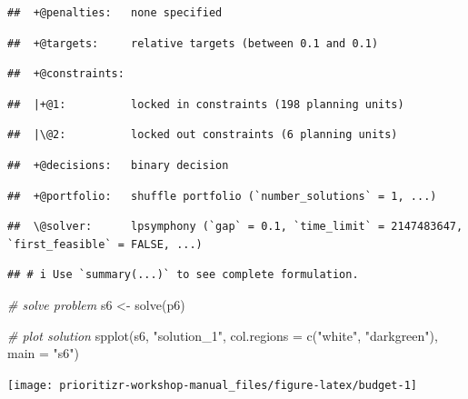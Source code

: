 \documentclass[
  12pt,
]{book}
\newenvironment{Shaded}{\begin{snugshade}}{\end{snugshade}}
\newcommand{\AttributeTok}[1]{\textcolor[rgb]{0.77,0.63,0.00}{#1}}
\newcommand{\CommentTok}[1]{\textcolor[rgb]{0.56,0.35,0.01}{\textit{#1}}}
\newcommand{\FunctionTok}[1]{\textcolor[rgb]{0.00,0.00,0.00}{#1}}
\newcommand{\NormalTok}[1]{#1}
\newcommand{\OtherTok}[1]{\textcolor[rgb]{0.56,0.35,0.01}{#1}}
\newcommand{\StringTok}[1]{\textcolor[rgb]{0.31,0.60,0.02}{#1}}
\begin{document}
\begin{verbatim}
##  +@penalties:   none specified
\end{verbatim}

\begin{verbatim}
##  +@targets:     relative targets (between 0.1 and 0.1)
\end{verbatim}

\begin{verbatim}
##  +@constraints:
\end{verbatim}

\begin{verbatim}
##  |+@1:          locked in constraints (198 planning units)
\end{verbatim}

\begin{verbatim}
##  |\@2:          locked out constraints (6 planning units)
\end{verbatim}

\begin{verbatim}
##  +@decisions:   binary decision
\end{verbatim}

\begin{verbatim}
##  +@portfolio:   shuffle portfolio (`number_solutions` = 1, ...)
\end{verbatim}

\begin{verbatim}
##  \@solver:      lpsymphony (`gap` = 0.1, `time_limit` = 2147483647, `first_feasible` = FALSE, ...)
\end{verbatim}

\begin{verbatim}
## # i Use `summary(...)` to see complete formulation.
\end{verbatim}

\begin{Shaded}
\begin{Highlighting}[]
\CommentTok{\# solve problem}
\NormalTok{s6 }\OtherTok{\textless{}{-}} \FunctionTok{solve}\NormalTok{(p6)}

\CommentTok{\# plot solution}
\FunctionTok{spplot}\NormalTok{(s6, }\StringTok{"solution\_1"}\NormalTok{, }\AttributeTok{col.regions =} \FunctionTok{c}\NormalTok{(}\StringTok{"white"}\NormalTok{, }\StringTok{"darkgreen"}\NormalTok{), }\AttributeTok{main =} \StringTok{"s6"}\NormalTok{)}
\end{Highlighting}
\end{Shaded}

\begin{center}\texttt{[image: prioritizr-workshop-manual\_files/figure-latex/budget-1]} \end{center}
\end{document}
